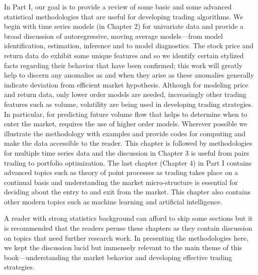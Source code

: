 
In Part I, our goal is to provide a review of some basic and some advanced statistical methodologies that are useful for developing trading algorithms. We begin with time series models (in Chapter 2) for univariate data and provide a broad discussion of autoregressive, moving average models---from model identification, estimation, inference and to model diagnostics. The stock price and return data do exhibit some unique features and so we identify certain stylized facts regarding their behavior that have been confirmed; this work will greatly help to discern any anomalies as and when they arise as these anomalies generally indicate deviation from efficient market hypothesis. Although for modeling price and return data, only lower order models are needed, increasingly other trading features such as volume, volatility are being used in developing trading strategies. In particular, for predicting future volume flow that helps to determine when to enter the market, requires the use of higher order models. Wherever possible we illustrate the methodology with examples and provide codes for computing and make the data accessible to the reader. This chapter is followed by methodologies for multiple time series data and the discussion in Chapter 3 is useful from pairs trading to portfolio optimization. The last chapter (Chapter 4) in Part I contains advanced topics such as theory of point processes as trading takes place on a continual basis and understanding the market micro-structure is essential for deciding about the entry to and exit from the market. This chapter also contains other modern topics such as machine learning and artificial intelligence. 


A reader with strong statistics background can afford to skip some sections but it is recommended that the readers peruse these chapters as they contain discussion on topics that need further research work. In presenting the methodologies here, we kept the discussion lucid but immensely relevant to the main theme of this book---understanding the market behavior and developing effective trading strategies. 








